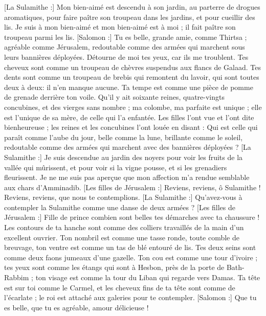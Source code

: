 \begin{multicols}{2}
[La Sulamithe :] Mon bien-aimé est descendu à son jardin, au parterre de drogues aromatiques, pour faire paître son troupeau dans les jardins, et pour cueillir des lis.
Je suis à mon bien-aimé et mon bien-aimé est à moi ; il fait paître son troupeau parmi les lis.
[Salomon :] Tu es belle, grande amie, comme Thirtsa ; agréable comme Jérusalem, redoutable comme des armées qui marchent sous leurs bannières déployées. 
Détourne de moi tes yeux, car ils me troublent. Tes cheveux sont comme un troupeau de chèvres suspendus aux flancs de Galaad.
Tes dents sont comme un troupeau de brebis qui remontent du lavoir, qui sont toutes deux à deux: il n'en manque aucune.
Ta tempe est comme une pièce de pomme de grenade derrière ton voile.
Qu'il y ait soixante reines, quatre-vingts concubines, et des vierges sans nombre ;
ma colombe, ma parfaite est unique ; elle est l'unique de sa mère, de celle qui l'a enfantée. Les filles l'ont vue et l'ont dite bienheureuse ; les reines et les concubines l'ont louée en disant :
Qui est celle qui paraît comme l'aube du jour, belle comme la lune, brillante comme le soleil, redoutable comme des armées qui marchent avec des bannières déployées ?
[La Sulamithe :] Je suis descendue au jardin des noyers pour voir les fruits de la vallée qui mûrissent, et pour voir si la vigne pousse, et si les grenadiers fleurissent.
Je ne me suis pas aperçue que mon affection m'a rendue semblable aux chars d'Amminadib.
\VerseOne{}[Les filles de Jérusalem :] Reviens, reviens, ô Sulamithe ! Reviens, reviens, que nous te contemplions. [La Sulamithe :] Qu'avez-vous à contempler la Sulamithe comme une danse de deux armées ?
[Les filles de Jérusalem :] Fille de prince combien sont belles tes démarches avec ta chaussure ! Les contours de ta hanche sont comme des colliers travaillés de la main d'un excellent ouvrier.
Ton nombril est comme une tasse ronde, toute comble de breuvage, ton ventre est comme un tas de blé entouré de lis.
Tes deux seins sont comme deux faons jumeaux d'une gazelle.
Ton cou est comme une tour d'ivoire ; tes yeux sont comme les étangs qui sont à Hesbon, près de la porte de Bath-Rabbim ; ton visage est comme la tour du Liban qui regarde vers Damas.
Ta tête est sur toi comme le Carmel, et les cheveux fins de ta tête sont comme de l'écarlate ; le roi est attaché aux galeries pour te contempler.
[Salomon :] Que tu es belle, que tu es agréable, amour délicieuse !

\end{multicols}
